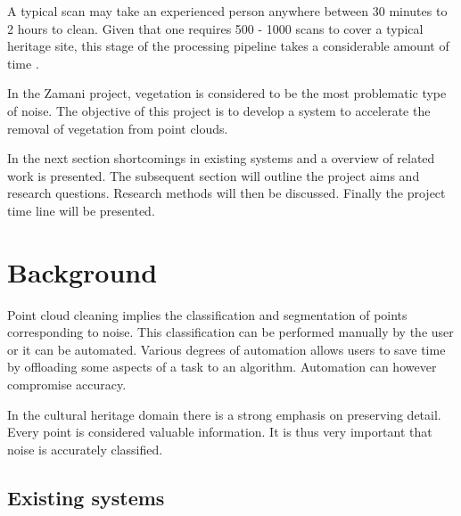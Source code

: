 \documentclass[10pt,twocolumn]{article}
\begin{document}
A typical scan may take an experienced person anywhere between 30 minutes to 2 hours to clean. Given that one requires 500 - 1000 scans to cover a typical heritage site, this stage of the processing pipeline takes a considerable amount of time \cite{Ruther2011}.

In the Zamani project, vegetation is considered to be the most problematic type of noise. The objective of this project is to develop a system to accelerate the removal of vegetation from point clouds.

In the next section shortcomings in existing systems and a overview of related work is presented. The subsequent section will outline the project aims and research questions. Research methods will then be discussed. Finally the project time line will be presented.

\section{Background}

Point cloud cleaning implies the classification and segmentation of points corresponding to noise. This classification can be performed manually by the user or it can be automated. Various degrees of automation allows users to save time by offloading some aspects of a task to an algorithm. Automation can however compromise accuracy.

In the cultural heritage domain there is a strong emphasis on preserving detail. Every point is considered valuable information. It is thus very important that noise is accurately classified.

\subsection{Existing systems}
\end{document}
